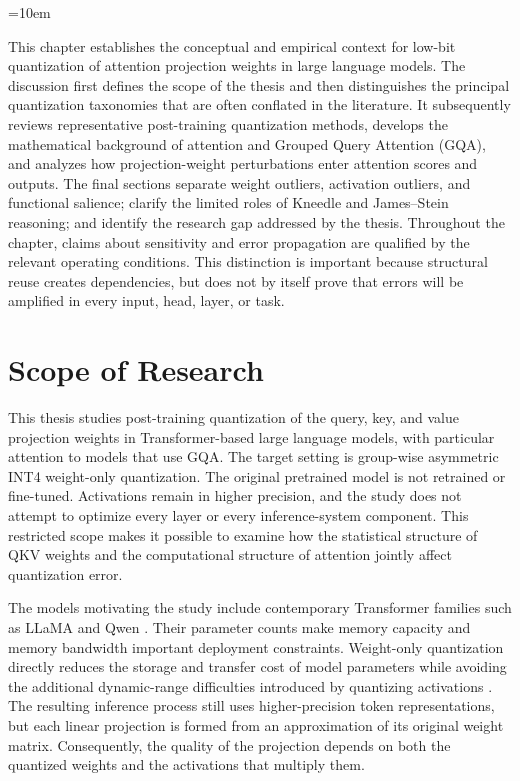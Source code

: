 \sloppy
\emergencystretch=10em

This chapter establishes the conceptual and empirical context for low-bit quantization of attention projection weights in large language models. The discussion first defines the scope of the thesis and then distinguishes the principal quantization taxonomies that are often conflated in the literature. It subsequently reviews representative post-training quantization methods, develops the mathematical background of attention and Grouped Query Attention (GQA), and analyzes how projection-weight perturbations enter attention scores and outputs. The final sections separate weight outliers, activation outliers, and functional salience; clarify the limited roles of Kneedle and James--Stein reasoning; and identify the research gap addressed by the thesis. Throughout the chapter, claims about sensitivity and error propagation are qualified by the relevant operating conditions. This distinction is important because structural reuse creates dependencies, but does not by itself prove that errors will be amplified in every input, head, layer, or task.

\section{Scope of Research}

This thesis studies post-training quantization of the query, key, and value projection weights in Transformer-based large language models, with particular attention to models that use GQA. The target setting is group-wise asymmetric INT4 weight-only quantization. The original pretrained model is not retrained or fine-tuned. Activations remain in higher precision, and the study does not attempt to optimize every layer or every inference-system component. This restricted scope makes it possible to examine how the statistical structure of QKV weights and the computational structure of attention jointly affect quantization error.

The models motivating the study include contemporary Transformer families such as LLaMA \cite{touvron2023llama} and Qwen \cite{qwen2023technical}. Their parameter counts make memory capacity and memory bandwidth important deployment constraints. Weight-only quantization directly reduces the storage and transfer cost of model parameters while avoiding the additional dynamic-range difficulties introduced by quantizing activations \cite{gholami2021survey,nagel2021white,lin2023awq,xiao2023smoothquant}. The resulting inference process still uses higher-precision token representations, but each linear projection is formed from an approximation of its original weight matrix. Consequently, the quality of the projection depends on both the quantized weights and the activations that multiply them.

